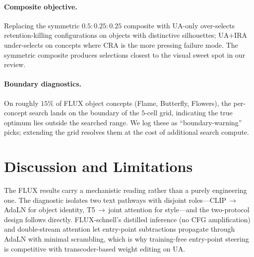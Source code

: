 \documentclass{article}
\begin{document}
\paragraph{Composite objective.} Replacing the symmetric
$0.5{:}0.25{:}0.25$ composite with UA-only over-selects
retention-killing configurations on objects with distinctive
silhouettes; UA${+}$IRA under-selects on concepts where CRA is the
more pressing failure mode. The symmetric composite produces
selections closest to the visual sweet spot in our review.

\paragraph{Boundary diagnostics.} On roughly $15\%$ of FLUX object
concepts (Flame, Butterfly, Flowers), the per-concept search lands
on the boundary of the $5$-cell grid, indicating the true optimum
lies outside the searched range. We log these as ``boundary-warning''
picks; extending the grid resolves them at the cost of additional
search compute.

\section{Discussion and Limitations}
\label{sec:discuss}

The FLUX results carry a mechanistic reading rather than a purely
engineering one. The diagnostic isolates two text pathways with
disjoint roles---CLIP\,$\to$\,AdaLN for object identity,
T5\,$\to$\,joint attention for style---and the two-protocol design
follows directly. FLUX-schnell's distilled inference (no CFG
amplification) and double-stream attention let entry-point
subtractions propagate through AdaLN with minimal scrambling, which
is why training-free entry-point steering is competitive with
transcoder-based weight editing on UA.
\end{document}
